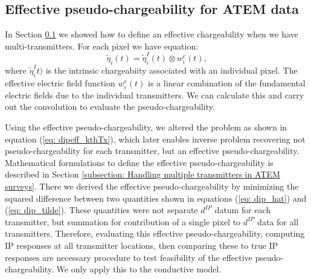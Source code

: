 \documentclass[extra,mreferee]{gji}
\newcommand{\peta}{\tilde{\eta}}
\newcommand{\dip}{d^{IP}}
\begin{document}
\subsection{Effective pseudo-chargeability for ATEM data}
\label{subsection: Effective pseudo-chargeability for ATEM data}

In Section \ref{subsection: Effective pseudo-chargeability for ATEM data} we showed how to define an effective chargeability when we have multi-transmitters. For each pixel we have
equation: 
\begin{equation}
  \peta_i(t) = \peta_i^I(t) \otimes  w_i^e(t),
\end{equation}
where $\peta_i^It)$ is the intrinsic chargeabiity associated with an individual pixel. The effective electric field function $w_i^e(t)$ is a linear combination of the fundamental electric fields due to the individual transmitters. We can calculate this and carry out the convolution to evaluate the pseudo-chargeability. 

Using the effective pseudo-chargeability, we altered the problem as shown in equation (\ref{eq: dipeff_kthTx}), which later enables inverse problem recovering not pseudo-chargeability for each transmitter, but an effective pseudo-chargeability. Mathematical formulations to define the effective pseudo-chargeability is described in Section \ref{subsection: Handling multiple transmitters in ATEM surveys}. There we derived the effective pseudo-chargeability by minimizing the squared difference between two quantities shown in equations (\ref{eq: dip_hat}) and (\ref{eq: dip_tilde}). These quantities were not separate $\dip$ datum for each transmitter, but summation for contribution of a single pixel to $\dip$ data for all transmitters. 
Therefore, evaluating this effective pseudo-chargeability, computing IP responses at all transmitter locations, then comparing these to true IP responses are necessary procedure to test feasibility of the effective pseudo-chargeability. 
We only apply this to the conductive model. 
\end{document}
